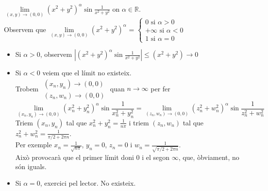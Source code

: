 \documentclass[../main.tex]{subfiles}
\begin{document}
    \begin{exemple}
        $\lim\limits_{(x,y) \rightarrow (0, 0)}(x^2+y^2)^\alpha \sin{\frac{1}{x^2+y^2}}$ on $\alpha \in \mathbb{R}$.
        \\Observem que $\lim\limits_{(x,y) \rightarrow (0, 0)}(x^2+y^2)^\alpha$ = $\begin{cases}
            0 \text{ si } \alpha > 0\\
            +\infty \text{ si } \alpha < 0\\
            1 \text{ si } \alpha = 0
        \end{cases}$
        \begin{itemize}
            \item Si $\alpha > 0$, observem $|(x^2+y^2)^\alpha \sin{\frac{1}{x^2+y^2}}| \leq (x^2+y^2) \longrightarrow 0$
            \item Si $\alpha < 0$  veiem que el límit no existeix.\\
            Trobem $\substack{(x_n, y_n) \rightarrow (0, 0)\\(z_n, w_n) \rightarrow (0, 0)}$ quan $n \rightarrow \infty$ per fer \begin{displaymath}
                \lim\limits_{(x_n,y_n) \rightarrow (0, 0)}(x_n^2+y_n^2)^\alpha \sin{\frac{1}{x_n^2+y_n^2}} = \lim\limits_{(z_n,w_n) \rightarrow (0, 0)}(z_n^2+w_n^2)^\alpha \sin{\frac{1}{z_n^2+w_n^2}}
            \end{displaymath}       
            Triem $(x_n, y_n)$ tal que $x_n^2 + y_n^2 = \frac{1}{n\pi}$ i triem $(z_n, w_n)$ tal que $z_n^2+w_n^2 = \frac{1}{\pi/2 + 2\pi n}$.\\
            Per exemple $x_n = \frac{1}{\sqrt{n\pi}}$, $y_n = 0$, $z_n = 0$ i $w_n = \frac{1}{\sqrt{\pi/2+2\pi n}}$.\\
            Això provocarà que el primer límit doni $0$ i el segon $\infty$, que, òbviament, no són
            iguals.
            \item Si $\alpha = 0$, exercici pel lector. No existeix.
        \end{itemize}
    \end{exemple}
\end{document}
